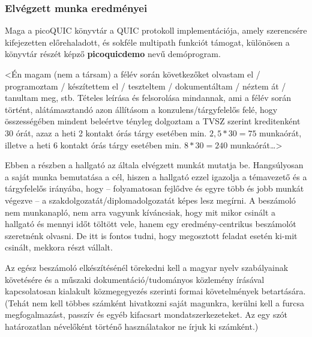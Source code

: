 \documentclass[a4paper,oneside]{article}
\begin{document}
\subsubsection{Elvégzett munka eredményei}




Maga a picoQUIC könyvtár a QUIC protokoll implementációja, amely szerencsére
kifejezetten előrehaladott, és sokféle multipath funkciót támogat, különösen 
a könyvtár részét képző \textbf{picoquicdemo} nevű demóprogram.



<Én magam (nem a társam) a félév során következőket olvastam el /
programoztam / készítettem el / teszteltem / dokumentáltam / néztem át
/ tanultam meg, stb.  Tételes leírása és felsorolása mindannak, ami a
félév során történt, alátámasztandó azon állításom a
konzulens/tárgyfelelős felé, hogy összességében mindent beleértve
tényleg dolgoztam a TVSZ szerint kreditenként 30 órát, azaz a heti 2
kontakt órás tárgy esetében min. $2,5*30 = 75$ munkaórát, illetve a
heti 6 kontakt órás tárgy esetében min. $8*30 = 240$ munkaórát\dots>

Ebben a részben a hallgató az általa elvégzett munkát mutatja
be. Hangsúlyosan a saját munka bemutatása a cél, hiszen a hallgató
ezzel igazolja a témavezető és a tárgyfelelős irányába, hogy --
folyamatosan fejlődve és egyre több és jobb munkát végezve -- a
szakdolgozatát/diplomadolgozatát képes lesz megírni.  A beszámoló nem
munkanapló, nem arra vagyunk kíváncsiak, hogy mit mikor csinált a
hallgató és mennyi időt töltött vele, hanem egy eredmény-centrikus
beszámolót szeretnénk olvasni.  De itt is fontos tudni, hogy
megosztott feladat esetén ki-mit csinált, mekkora részt vállalt.

Az egész beszámoló elkészítésénél törekedni kell a magyar nyelv
szabályainak követésére és a műszaki dokumentáció/tudományos közlemény
írásával kapcsolatosan kialakult közmegegyezés szerinti formai
követelmények betartására.  (Tehát nem kell többes számként hivatkozni
saját magunkra, kerülni kell a furcsa megfogalmazást, passzív és egyéb
kifacsart mondatszerkezeteket.  Az egy szót határozatlan névelőként
történő használatakor ne írjuk ki számként.)
\end{document}
